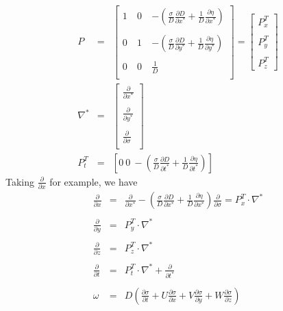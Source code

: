 \documentclass[oribibl]{llncs}
\begin{document}
\begin{eqnarray}
P
&=&
\left[             
  \begin{array}{ccc}  
   1\ & 0\  & -\left( \frac{\sigma}{D} \frac{\partial D}{\partial x^*} + \frac{1}{D}\frac{\partial \eta}{\partial x^*} \right)\\   \nonumber \\ 
   0\  & 1\ & -\left(\frac{\sigma}{D} \frac{\partial D}{\partial y^*} + \frac{1}{D}\frac{\partial \eta}{\partial y^*} \right)\\   \nonumber \\ 
   0\ & 0\ & \frac{1}{D} \													      \\   
  \end{array}
\right]
=
\left[                 
  \begin{array}{c}  
    P^T_x  \\   \\ 
    P^T_y  \\  \\ 
    P^T_z  
  \end{array}
\right] 
\\
\nabla^*  &=&
\left[                 
  \begin{array}{c}  
    \frac{\partial}{\partial x^*}  \\  \\ 
    \frac{\partial}{\partial y^*}  \\ \\ 
    \frac{\partial}{\partial \sigma}  \\ 
  \end{array}
\right]\nonumber
\\
P^T_t &=&
\left[
0 \  0 \  -\left( \frac{\sigma}{D} \frac{\partial D}{\partial t^*} + \frac{1}{D}\frac{\partial \eta}{\partial t^*} \right)
\right] \nonumber 
\end{eqnarray}
Taking $\frac{\partial}{\partial x}$ for example, we have
\begin{eqnarray*}
  \frac{\partial}{\partial x}&=& \frac{\partial}{\partial x^*}-(\frac{\sigma}{D}\frac{\partial D}{\partial x^*}+\frac{1}{D}\frac{\partial \eta}{\partial x^*})\frac{\partial}{\partial \sigma}= P^T_x \cdot \nabla^* \\ \\
   \frac{\partial}{\partial y}&=& P^T_y \cdot \nabla ^* \\ \\
   \frac{\partial}{\partial z}&=& P^T_z \cdot \nabla ^*\\ \\
   \frac{\partial}{\partial t}&=& P^T_t \cdot \nabla ^* +   \frac{\partial}{\partial t^*}  
\\ \nonumber \\
\omega &=& D\left(\frac{\partial \sigma}{\partial t} + U\frac{\partial \sigma}{\partial x} + V\frac{\partial \sigma}{\partial y} + W\frac{\partial \sigma}{\partial z} \right)
\end{eqnarray*}
\end{document}
